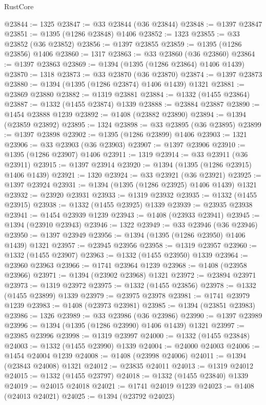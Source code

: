 \begin{lexlean}{RustCore}
\begin{coremodule}
@23844 := 1325
@23847 := @33 @23844 (@36 @23844)
@23848 := @1397 @23847
@23851 := @1395 (@1286 @23848) @1406
@23852 := 1323
@23855 := @33 @23852 (@36 @23852)
@23856 := @1397 @23855
@23859 := @1395 (@1286 @23856) @1406
@23860 := 1317
@23863 := @33 @23860 (@36 @23860)
@23864 := @1397 @23863
@23869 := @1394 (@1395 (@1286 @23864) @1406 @1439)
@23870 := 1318
@23873 := @33 @23870 (@36 @23870)
@23874 := @1397 @23873
@23880 := @1394 (@1395 (@1286 @23874) @1406 @1439) @1321
@23881 := @23869 @23880
@23882 := @1319 @23881
@23884 := @1332 (@1455 @23864)
@23887 := @1332 (@1455 @23874) @1339
@23888 := @23884 @23887
@23890 := @1454 @23888 @1239
@23892 := @1408 (@23882 @23890)
@23894 := @1394 (@23859 @23892)
@23895 := 1324
@23898 := @33 @23895 (@36 @23895)
@23899 := @1397 @23898
@23902 := @1395 (@1286 @23899) @1406
@23903 := 1321
@23906 := @33 @23903 (@36 @23903)
@23907 := @1397 @23906
@23910 := @1395 (@1286 @23907) @1406
@23911 := 1319
@23914 := @33 @23911 (@36 @23911)
@23915 := @1397 @23914
@23920 := @1394 (@1395 (@1286 @23915) @1406 @1439)
@23921 := 1320
@23924 := @33 @23921 (@36 @23921)
@23925 := @1397 @23924
@23931 := @1394 (@1395 (@1286 @23925) @1406 @1439) @1321
@23932 := @23920 @23931
@23933 := @1319 @23932
@23935 := @1332 (@1455 @23915)
@23938 := @1332 (@1455 @23925) @1339
@23939 := @23935 @23938
@23941 := @1454 @23939 @1239
@23943 := @1408 (@23933 @23941)
@23945 := @1394 (@23910 @23943)
@23946 := 1322
@23949 := @33 @23946 (@36 @23946)
@23950 := @1397 @23949
@23956 := @1394 (@1395 (@1286 @23950) @1406 @1439) @1321
@23957 := @23945 @23956
@23958 := @1319 @23957
@23960 := @1332 (@1455 @23907)
@23963 := @1332 (@1455 @23950) @1339
@23964 := @23960 @23963
@23966 := @1741 @23964 @1239
@23968 := @1408 (@23958 @23966)
@23971 := @1394 (@23902 @23968) @1321
@23972 := @23894 @23971
@23973 := @1319 @23972
@23975 := @1332 (@1455 @23856)
@23978 := @1332 (@1455 @23899) @1339
@23979 := @23975 @23978
@23981 := @1741 @23979 @1239
@23983 := @1408 (@23973 @23981)
@23985 := @1394 (@23851 @23983)
@23986 := 1326
@23989 := @33 @23986 (@36 @23986)
@23990 := @1397 @23989
@23996 := @1394 (@1395 (@1286 @23990) @1406 @1439) @1321
@23997 := @23985 @23996
@23998 := @1319 @23997
@24000 := @1332 (@1455 @23848)
@24003 := @1332 (@1455 @23990) @1339
@24004 := @24000 @24003
@24006 := @1454 @24004 @1239
@24008 := @1408 (@23998 @24006)
@24011 := @1394 (@23843 @24008) @1321
@24012 := @23835 @24011
@24013 := @1319 @24012
@24015 := @1332 (@1455 @23797)
@24018 := @1332 (@1455 @23840) @1339
@24019 := @24015 @24018
@24021 := @1741 @24019 @1239
@24023 := @1408 (@24013 @24021)
@24025 := @1394 (@23792 @24023)

\end{coremodule}
\end{lexlean}
